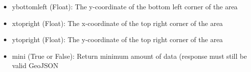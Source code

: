 \documentclass[letterpaper,10pt,english]{sphinxmanual}
\begin{document}
\begin{fulllineitems}
\begin{itemize}
\item {} 
ybottomleft (Float): The y-coordinate of the bottom left corner of the area

\item {} 
xtopright (Float): The x-coordinate of the top right corner of the area

\item {} 
ytopright (Float): The y-coordinate of the top right corner of the area

\item {} 
mini (True or False): Return minimum amount of data (response must still be valid GeoJSON

\end{itemize}

\end{fulllineitems}

\end{document}
